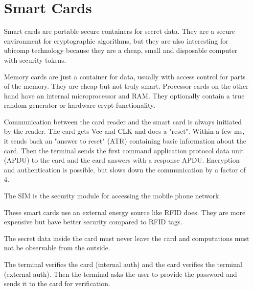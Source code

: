 \section{Smart Cards}
\begin{mytitle} Smart cards are portable secure containers for secret data. They are a secure environment for cryptographic algorithms, but they are also interesting for ubicomp technology because they are a cheap, small and disposable computer with security tokens. 
\end{mytitle}
\begin{mytitle} Memory cards are just a container for data, usually with access control for parts of the memory. They are cheap but not truly smart. Processor cards on the other hand have an internal microprocessor and RAM. They optionally contain a true random generator or hardware crypt-functionality.
\end{mytitle}
\begin{mytitle} Communication between the card reader and the smart card is always initiated by the reader. The card gets Vcc and CLK and does a "reset". Within a few ms, it sends back an "answer to reset" (ATR) containing basic information about the card. Then the terminal sends the first command application protocol data unit (APDU) to the card and the card answers with a response APDU. Encryption and authentication is possible, but slows down the communication by a factor of 4.
\end{mytitle}
\begin{mytitle} The SIM is the security module for accessing the mobile phone network.
\end{mytitle}
\begin{mytitle} These smart cards use an external energy source like RFID does. They are more expensive but have better security compared to RFID tags.
\end{mytitle}
\begin{myremark} The secret data inside the card must never leave the card and computations must not be observable from the outside.
\end{myremark}
\begin{mytitle} The terminal verifies the card (internal auth) and the card verifies the terminal (external auth). Then the terminal asks the user to provide the password and sends it to the card for verification.
\end{mytitle}

